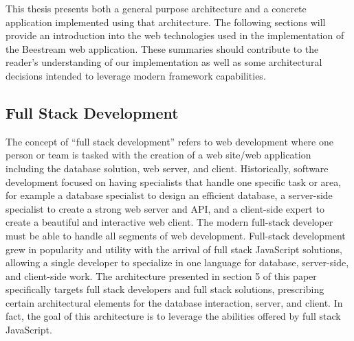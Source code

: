 %
%

This thesis presents both a general purpose architecture and a concrete application implemented using that architecture.  The following sections will provide an introduction into the web technologies used in the implementation of the Beestream web application.  These summaries should contribute to the reader’s understanding of our implementation as well as some architectural decisions intended to leverage modern framework capabilities.  \par

\subsection{Full Stack Development}
The concept of “full stack development” refers to web development where one person or team is tasked with the creation of a web site/web application including the database solution, web server, and client. Historically, software development focused on having specialists that handle one specific task or area, for example a database specialist to design an efficient database, a server-side specialist to create a strong web server and API, and a client-side expert to create a beautiful and interactive web client.  The modern full-stack developer must be able to handle all segments of web development.  Full-stack development grew in popularity and utility with the arrival of full stack JavaScript solutions, allowing a single developer to specialize in one language for database, server-side, and client-side work.  The architecture presented in section 5 of this paper specifically targets full stack developers and full stack solutions, prescribing certain architectural elements for the database interaction, server, and client.  In fact, the goal of this architecture is to leverage the abilities offered by full stack JavaScript. \par

